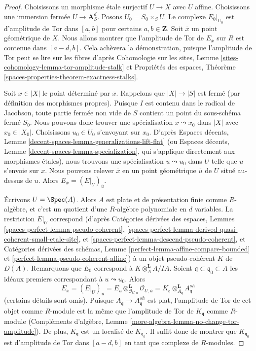 \begin{proof}
Choisissons un morphisme \'etale surjectif $U \to X$ avec $U$ affine.
Choisissons une immersion fermée $U \to \mathbf{A}^d_S$.
Posons $U_0 = S_0 \times_S U$.
Le complexe $E_0|_{U_0}$ est d'amplitude de Tor
dans $[a, b]$ pour certains $a, b \in \mathbf{Z}$.
Soit $\overline{x}$ un point géométrique de $X$.
Nous allons montrer que l'amplitude de Tor de
$E_{\overline{x}}$ sur $R$ est contenue dans $[a - d, b]$.
Cela achèvera la démonstration, puisque l'amplitude de Tor peut se
lire sur les fibres d'après
Cohomologie sur les sites, Lemme \ref{sites-cohomology-lemma-tor-amplitude-stalk}
et Propriétés des espaces, Théorème
\ref{spaces-properties-theorem-exactness-stalks}.

\medskip\noindent
Soit $x \in |X|$ le point déterminé par $\overline{x}$.
Rappelons que $|X| \to |S|$ est fermé (par définition des morphismes propres).
Puisque $I$ est contenu dans le radical de Jacobson, toute partie fermée non vide
de $S$ contient un point du sous-schéma fermé $S_0$.
Nous pouvons donc trouver une spécialisation $x \leadsto x_0$ dans $|X|$
avec $x_0 \in |X_0|$. Choisissons $u_0 \in U_0$ s'envoyant sur $x_0$.
D'après Espaces décents, Lemme \ref{decent-spaces-lemma-generalizations-lift-flat}
(ou Espaces décents, Lemme \ref{decent-spaces-lemma-specialization},
qui s'applique directement aux morphismes \'etales),
nous trouvons une spécialisation $u \leadsto u_0$ dans $U$
telle que $u$ s'envoie sur $x$. Nous pouvons relever $\overline{x}$
en un point géométrique $\overline{u}$ de $U$ situé au-dessus de $u$.
Alors $E_{\overline{x}} = (E|_U)_{\overline{u}}$.

\medskip\noindent
Écrivons $U = \Spec(A)$. Alors $A$ est plate et de présentation finie
comme $R$-algèbre, et c'est un quotient d'une $R$-algèbre polynomiale en
$d$ variables. La restriction $E|_U$ correspond
(d'après Catégories dérivées des espaces, Lemmes
\ref{spaces-perfect-lemma-pseudo-coherent},
\ref{spaces-perfect-lemma-derived-quasi-coherent-small-etale-site}, et
\ref{spaces-perfect-lemma-descend-pseudo-coherent},
et
Catégories dérivées des schémas, Lemme
\ref{perfect-lemma-affine-compare-bounded} et
\ref{perfect-lemma-pseudo-coherent-affine})
à un objet pseudo-cohérent $K$ de $D(A)$.
Remarquons que $E_0$ correspond à $K \otimes_A^\mathbf{L} A/IA$.
Soient $\mathfrak q \subset \mathfrak q_0 \subset A$ les idéaux premiers
correspondant à $u \leadsto u_0$.
Alors
$$
E_{\overline{x}} =
(E|_U)_{\overline{u}} =
E_u \otimes_{\mathcal{O}_{U, u}}^\mathbf{L} \mathcal{O}_{U, \overline{u}} =
K_{\mathfrak q} \otimes_{A_\mathfrak q}^\mathbf{L} A_{\mathfrak q}^{sh}
$$
(certains détails sont omis). Puisque $A_\mathfrak q \to A_\mathfrak q^{sh}$
est plat, l'amplitude de Tor de cet objet comme $R$-module est la même que
l'amplitude de Tor de $K_\mathfrak q$ comme $R$-module
(Compléments d'algèbre, Lemme \ref{more-algebra-lemma-no-change-tor-amplitude}).
De plus, $K_{\mathfrak q}$ est un localisé de $K_{\mathfrak q_0}$.
Il suffit donc de montrer que $K_{\mathfrak q_0}$ est d'amplitude de Tor dans
$[a - d, b]$ en tant que complexe de $R$-modules.


\end{proof}
